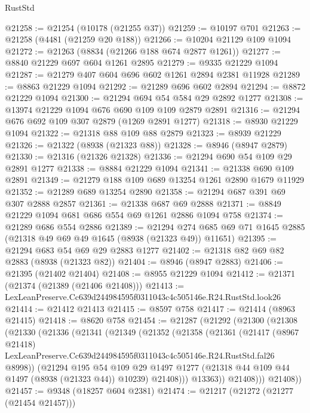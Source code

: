 \begin{lexlean}{RustStd}
\begin{coremodule}
@21258 := @21254 (@10178 (@21255 @37))
@21259 := @10197 @701
@21263 := @21258 (@4481 (@21259 @20 @188))
@21266 := @10204 @21129 @109 @1094
@21272 := @21263 (@8834 (@21266 @188 @674 @2877 @1261))
@21277 := @8840 @21229 @697 @604 @1261 @2895
@21279 := @9335 @21229 @1094
@21287 := @21279 @407 @604 @696 @602 @1261 @2894 @2381 @11928
@21289 := @8863 @21229 @1094
@21292 := @21289 @696 @602 @2894
@21294 := @8872 @21229 @1094
@21300 := @21294 @694 @54 @584 @29 @2892 @1277
@21308 := @13974 @21229 @1094 @676 @690 @109 @109 @2879 @2891
@21316 := @21294 @676 @692 @109 @307 @2879 (@1269 @2891 @1277)
@21318 := @8930 @21229 @1094
@21322 := @21318 @88 @109 @88 @2879
@21323 := @8939 @21229
@21326 := @21322 (@8938 (@21323 @88))
@21328 := @8946 (@8947 @2879)
@21330 := @21316 (@21326 @21328)
@21336 := @21294 @690 @54 @109 @29 @2891 @1277
@21338 := @8884 @21229 @1094
@21341 := @21338 @690 @109 @2891
@21349 := @21279 @188 @109 @689 @13254 @1261 @2890 @1679 @11929
@21352 := @21289 @689 @13254 @2890
@21358 := @21294 @687 @391 @69 @307 @2888 @2857
@21361 := @21338 @687 @69 @2888
@21371 := @8849 @21229 @1094 @681 @686 @554 @69 @1261 @2886 @1094 @758
@21374 := @21289 @686 @554 @2886
@21389 := @21294
    @274
    @685
    @69
    @71
    @1645
    @2885
    (@21318 @49 @69 @49 @1645 (@8938 (@21323 @49)) @11651)
@21395 := @21294 @683 @54 @69 @29 @2883 @1277
@21402 := @21318 @82 @69 @82 @2883 (@8938 (@21323 @82))
@21404 := @8946 (@8947 @2883)
@21406 := @21395 (@21402 @21404)
@21408 := @8955 @21229 @1094
@21412 := @21371 (@21374 (@21389 (@21406 @21408)))
@21413 := LexLeanPreserve.Cc639d244984595f0311043c4c505146e.R24.RustStd.look26
@21414 := @21412 @21413
@21415 := @8597 @758
@21417 := @21414 (@8963 @21415)
@21418 := @8620 @758
@21454 := @21287
    (@21292
      (@21300
        (@21308
          (@21330
            (@21336
              (@21341
                (@21349
                  (@21352
                    (@21358
                      (@21361
                        (@21417
                          (@8967 @21418)
                          LexLeanPreserve.Cc639d244984595f0311043c4c505146e.R24.RustStd.fal26
                          @8998))
                      (@21294
                        @195
                        @54
                        @109
                        @29
                        @1497
                        @1277
                        (@21318 @44 @109 @44 @1497 (@8938 (@21323 @44)) @10239)
                        @21408)))
                  @13363))
              @21408)))
        @21408))
@21457 := @9348 (@18257 @604 @2381)
@21474 := @21217
    (@21272 (@21277 (@21454 @21457)))

\end{coremodule}
\end{lexlean}
